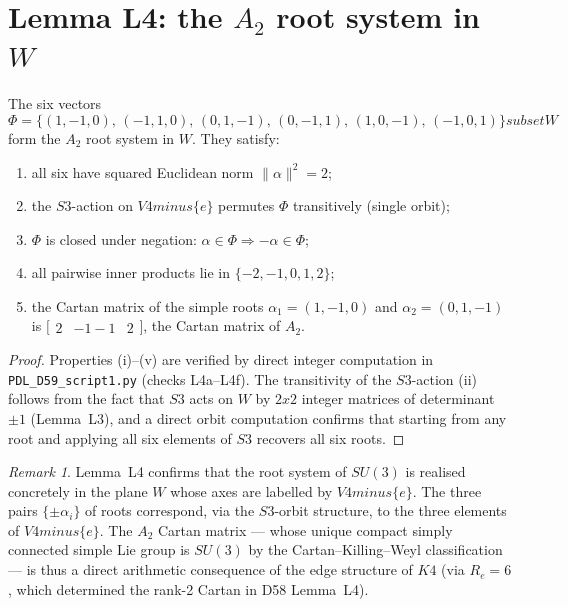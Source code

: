 \documentclass[11pt,a4paper]{article}
\def\\{}%
\def\Vfour{V4}%
\def\Sthree{S3}%
\def\SUthree{SU(3)}%
\def\Kfour{K4}%
\def\Re{Re}%
\def\times{x}%
\def\setminus{ minus }%
\def\subset{ subset }%
\def\mathrm#1{#1}%
\newenvironment{lemmabox}[1][]{%
  \begin{tcolorbox}[lemmastyle,title={Lemma\ifx\relax#1\relax\else: #1\fi}]}{\end{tcolorbox}}
\theoremstyle{plain}
\theoremstyle{definition}
\theoremstyle{remark}
\newtheorem{remark}[theorem]{Remark}
\newcommand{\Kfour}{K_4}
\newcommand{\Vfour}{V_4}
\newcommand{\Sthree}{S_3}
\newcommand{\SUthree}{\mathrm{SU}(3)}
\renewcommand{\Re}{R_e}
\begin{document}
\section{Lemma L4: the \texorpdfstring{$A_2$}{A2} root system in \texorpdfstring{$W$}{W}}
\label{sec:L4}

\begin{lemmabox}[L4 --- $A_2$ root system in the trace-zero plane]
\label{lem:L4}
The six vectors
\[
\Phi = \bigl\{(1,-1,0),\,(-1,1,0),\,(0,1,-1),\,(0,-1,1),\,(1,0,-1),\,(-1,0,1)\bigr\} \subset W
\]
form the $A_2$ root system in $W$. They satisfy:
\begin{enumerate}[label=(\roman*),leftmargin=2em]
\item all six have squared Euclidean norm $\|\alpha\|^2 = 2$;
\item the $\Sthree$-action on $\Vfour \setminus \{e\}$ permutes $\Phi$ transitively (single orbit);
\item $\Phi$ is closed under negation: $\alpha \in \Phi \Rightarrow -\alpha \in \Phi$;
\item all pairwise inner products lie in $\{-2,-1,0,1,2\}$;
\item the Cartan matrix of the simple roots $\alpha_1 = (1,-1,0)$ and $\alpha_2 = (0,1,-1)$ is $\bigl[\begin{smallmatrix}2&-1\\-1&2\end{smallmatrix}\bigr]$, the Cartan matrix of $A_2$.
\end{enumerate}
\end{lemmabox}

\begin{proof}
Properties (i)--(v) are verified by direct integer computation in \texttt{PDL\_D59\_script1.py} (checks L4a--L4f). The transitivity of the $\Sthree$-action (ii) follows from the fact that $\Sthree$ acts on $W$ by $2\times 2$ integer matrices of determinant $\pm 1$ (Lemma~L3), and a direct orbit computation confirms that starting from any root and applying all six elements of $\Sthree$ recovers all six roots.
\end{proof}

\begin{remark}
Lemma~L4 confirms that the root system of $\SUthree$ is realised concretely in the plane $W$ whose axes are labelled by $\Vfour \setminus \{e\}$. The three pairs $\{\pm\alpha_i\}$ of roots correspond, via the $\Sthree$-orbit structure, to the three elements of $\Vfour \setminus \{e\}$. The $A_2$ Cartan matrix --- whose unique compact simply connected simple Lie group is $\SUthree$ by the Cartan--Killing--Weyl classification --- is thus a direct arithmetic consequence of the edge structure of $\Kfour$ (via $\Re = 6$, which determined the rank-2 Cartan in D58 Lemma~L4).
\end{remark}
\end{document}
